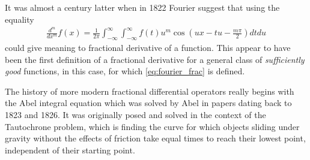 It was almost a century latter when in 1822 Fourier suggest that using the equality
\begin{align}
    \label{eq:fourier_frac}
    \frac{d^m}{dx^m} f(x) = \frac{1}{2\pi} \int_{-\infty}^\infty \int_{-\infty}^\infty f(t)u^m \cos\left(ux - tu - \frac{m\pi}{2}\right) dt du
\end{align}
could give meaning to fractional derivative of a function. This appear to have been the first definition of a fractional derivative for a general class of \emph{sufficiently good} functions, in this case, for which \eqref{eq:fourier_frac} is defined.

The history of more modern fractional differential operators really begins with the Abel integral equation which was solved by Abel in papers dating back to 1823 and 1826. It was originally posed and solved in the context of the Tautochrone problem, which is finding the curve for which objects sliding under gravity without the effects of friction take equal times to reach their lowest point, independent of their starting point.


